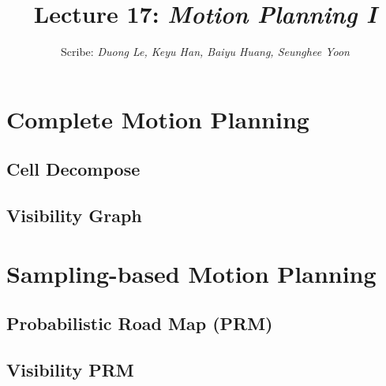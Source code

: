 \documentclass[11pt]{article}
\title{Lecture 17: \it{Motion Planning I}}
\author{Scribe:  \it{Duong Le, Keyu Han, Baiyu Huang, Seunghee Yoon}}
\date{}
\begin{document}
\maketitle
\thispagestyle{fancy}
\section{Complete Motion Planning}
\subsection{Cell Decompose}
\subsection{Visibility Graph}
\section{Sampling-based Motion Planning}
\subsection{Probabilistic Road Map (PRM)}
\subsection{Visibility PRM}
\end{document}
